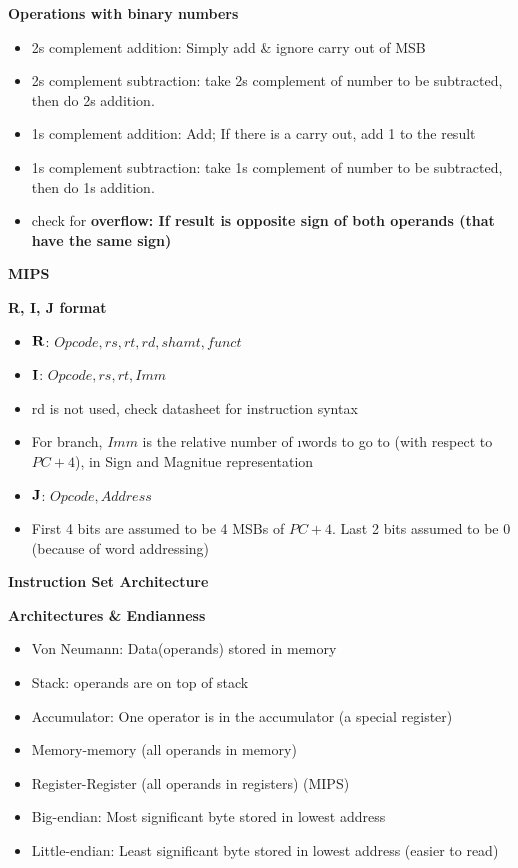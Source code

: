\documentclass[a4paper]{article} \usepackage[backend=biber, style=numeric, sorting=none]{biblatex}
\begin{document}
\begin{multicols*}{4}
\textbf{Operations with binary numbers}
\begin{itemize}
\itemsep -0.5em
\item 2s complement addition: Simply add \& ignore carry out of MSB
\item 2s complement subtraction: take 2s complement of number to be subtracted, then do 2s addition.
\item 1s complement addition: Add; If there is a carry out, add 1 to the result
\item 1s complement subtraction: take 1s complement of number to be subtracted, then do 1s addition.
\item check for \bf{overflow}: If result is opposite sign of both operands (that have the same sign)
\end{itemize}

{\small\textbf{MIPS}}

\textbf{R, I, J format}
\begin{itemize}
\itemsep -0.5em
\item $\bf{R}$: $Opcode, rs, rt, rd, shamt, funct$
\item $\bf{I}$: $Opcode, rs, rt, Imm$
\item rd is not used, check datasheet for instruction syntax
\item For branch, $Imm$ is the relative number of \i{words} to go to (with respect to $PC + 4$), in Sign and Magnitue representation
\item $\bf{J}$: $Opcode, Address$
\item First 4 bits are assumed to be 4 MSBs of $PC + 4$. Last 2 bits assumed to be 0 (because of word addressing)
\end{itemize}

{\small\textbf{Instruction Set Architecture}}

\textbf{Architectures \& Endianness}
\begin{itemize}
\itemsep -0.5em
\item Von Neumann: Data(operands) stored in memory
\item Stack: operands are on top of stack
\item Accumulator: One operator is in the accumulator (a special register)
\item Memory-memory (all operands in memory)
\item Register-Register (all operands in registers) (MIPS)
\item Big-endian: Most significant byte stored in lowest address
\item Little-endian: Least significant byte stored in lowest address (easier to read)
\end{itemize}


\end{multicols*}
\end{document}
